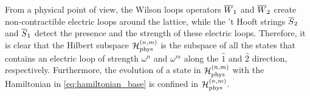 From a physical point of view, the Wilson loops operators $\overline{W}_1$ and $\overline{W}_2$ create non-contractible electric loops around the lattice, while  the 't Hooft strings $\overline{S}_2$ and $\overline{S}_1$ detect the presence and the strength of these electric loops.
Therefore, it is clear that the Hilbert subspace $\mathcal{H}_{\text{phys}}^{(n, m)}$ is the subspace of all the states that contains an electric loop of strength $\omega^n$ and $\omega^{m}$ along the $\hat{1}$ and $\hat{2}$ direction, respectively.
Furthermore, the evolution of a state in $\mathcal{H}_{\text{phys}}^{(n,m)}$ with the Hamiltonian in \eqref{eq:hamiltonian_base} is confined in $\mathcal{H}_{\text{phys}}^{(n,m)}$.
